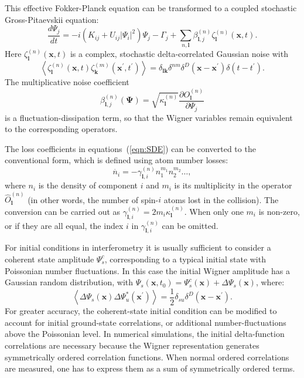 \documentclass[aps,prl,twocolumn,showpacs,amsmath,amssymb,superscriptaddress]{revtex4-1}
\newcommand{\xvec}{\boldsymbol{x}}
\newcommand{\kvec}{\boldsymbol{k}}
\newcommand{\lvec}{\boldsymbol{l}}
\newcommand{\Psivec}{\boldsymbol{\Psi}}
\begin{document}
This effective Fokker-Planck equation can be transformed
to a coupled stochastic Gross-Pitaevskii equation:
\begin{equation}
\label{eqn:SDE}
	\frac{d\Psi_{j}}{dt} = -i \left( K_{ij} + U_{ij} \lvert \Psi_{i} \rvert ^{2} \right) \Psi_{j} -
	\Gamma_{j} + \sum_{n,\lvec} \beta_{\lvec,j}^{(n)} \zeta_{\lvec}^{(n)} (\xvec,t).
\end{equation}
Here $\zeta_{\lvec}^{(n)}(\xvec, t)$ is a complex,
stochastic delta-correlated Gaussian noise with
\begin{equation}
	\left\langle
		\zeta_{\lvec}^{(n)} (\xvec,t) \zeta_{\kvec}^{(m)}(\xvec^\prime, t^\prime)
	\right\rangle =
	\delta_{\lvec \kvec} \delta^{nm} \delta^{D} \left(
		\xvec - \xvec^\prime
	\right)
	\delta \left( t - t^\prime \right).
\end{equation}
The multiplicative noise coefficient
\begin{equation}
	\beta_{\lvec,j}^{(n)} \left( \Psivec \right) =
	\sqrt{\kappa_{\lvec}^{(n)}}
	\frac{\partial O_{\lvec}^{(n)}}{\partial\Psi_{j}}
\end{equation}
is a fluctuation-dissipation term,
so that the Wigner variables remain equivalent to the corresponding operators.

The loss coefficients in equations~(\ref{eqn:SDE}) can be converted to the conventional form,
which is defined using atom number losses:
\begin{equation}
	\dot{n_i} = - \gamma^{(n)}_{\lvec,i} n^{m_1}_1 n^{m_2}_2 \ldots ,
\end{equation}
where $n_i$ is the density of component $i$ and $m_i$
is its multiplicity in the operator $\hat{O}^{(n)}_{\lvec}$
(in other words, the number of spin-$i$ atoms lost in the collision).
The conversion can be carried out as $\gamma^{(n)}_{\lvec,i} = 2 m_i \kappa^{(n)}_{\lvec}$.
When only one $m_i$ is non-zero, or if they are all equal,
the index $i$ in $\gamma^{(n)}_{\lvec,i}$ can be omitted.

For initial conditions in interferometry it is usually sufficient
to consider a coherent state amplitude $\Psi_{s}^{c}$,
corresponding to a typical initial state with Poissonian number fluctuations.
In this case the initial Wigner amplitude has a Gaussian random distribution,
with $\Psi_{s}(\xvec,t_{0})=\Psi_{s}^{c}(\xvec)+\Delta\Psi_{s}(\xvec)$,
where:
\begin{equation}
	\left\langle
		\Delta\Psi_{s}(\xvec) \Delta\Psi_{u}^{*}(\xvec^\prime)
	\right\rangle =
	\frac{1}{2} \delta_{su} \delta^{D} \left( \xvec - \xvec^\prime\right).
\end{equation}
For greater accuracy, the coherent-state initial condition
can be modified to account for initial ground-state correlations,
or additional number-fluctuations above the Poissonian level.
In numerical simulations, the initial delta-function correlations are necessary
because the Wigner representation generates symmetrically ordered correlation functions. When normal ordered correlations are measured,
one has to express them as a sum of symmetrically ordered terms.
\end{document}
